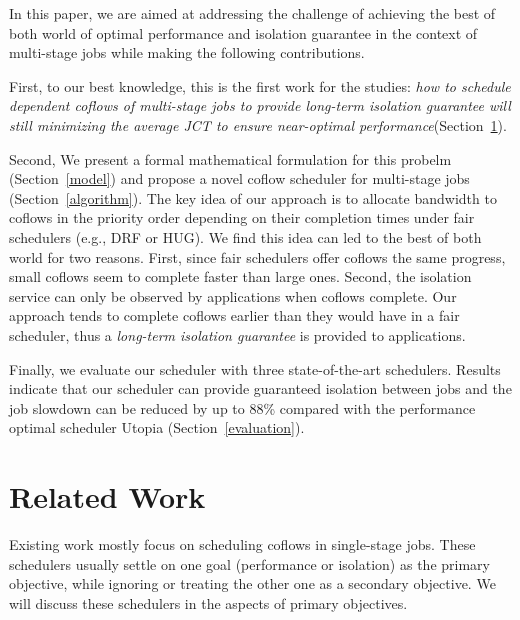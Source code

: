 \documentclass[10pt, conference, letterpaper]{IEEEtran}
\begin{document}
In this paper, we are aimed at addressing the challenge of achieving the best of both world of optimal performance and isolation guarantee in the context of multi-stage jobs while making the following contributions. 

First, to our best knowledge, this is the first work for the studies: \emph{how to schedule dependent coflows of multi-stage jobs to provide long-term isolation guarantee will still minimizing the average JCT to ensure near-optimal performance}(Section~\ref{related}).

Second, We present a formal mathematical formulation for this probelm (Section~\ref{model}) and propose a novel coflow scheduler for multi-stage jobs (Section~\ref{algorithm}). The key idea of our approach is to allocate bandwidth to coflows in the priority order depending on their completion times under fair schedulers (e.g., DRF\cite{DRF} or HUG\cite{HUG}). We find this idea can led to the best of both world for two reasons. First, since fair schedulers offer coflows the same progress, small coflows seem to complete faster than large ones. %
 Second, the isolation service can only be observed by applications when coflows complete. Our approach tends to complete coflows earlier than they would have in a fair scheduler, thus a \emph{long-term isolation guarantee} is provided to applications. %

Finally, we evaluate our scheduler with three state-of-the-art schedulers. Results indicate that our scheduler can provide guaranteed isolation between jobs and the job slowdown can be reduced by up to 88\% compared with the performance optimal scheduler Utopia (Section~\ref{evaluation}).

\section{Related Work}\label{related}
Existing work mostly focus on scheduling coflows in single-stage jobs. These schedulers usually settle on one goal (performance or isolation) as the primary objective, while ignoring or treating the other one as a secondary objective. We will discuss these schedulers in the aspects of primary objectives.
\end{document}
